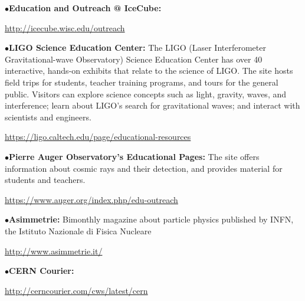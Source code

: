 \smallskip


\smallskip

\item{$\bullet$}{\bf Education and Outreach @ IceCube:}
    \item{}\qquad\url{http://icecube.wisc.edu/outreach}


\smallskip

\item{$\bullet$}{\bf LIGO Science Education Center:}
The LIGO (Laser Interferometer 
Gravitational-wave Observatory) Science Education Center has over 
40 interactive, hands-on exhibits that relate to the science of LIGO. The 
site hosts field trips for students, teacher training programs, and tours 
for the general public. Visitors can explore science concepts such as 
light, gravity, waves, and interference; learn about LIGO's search for 
gravitational waves; and interact with scientists and engineers.
     \item{}\qquad\url{https://ligo.caltech.edu/page/educational-resources}


\smallskip

\item{$\bullet$}{\bf Pierre Auger Observatory's Educational Pages:}
The site offers information about cosmic rays and their detection, and provides material for students and teachers.
     \item{}\qquad\url{https://www.auger.org/index.php/edu-outreach}

\medskip
\medskip



\medskip


\item{$\bullet$}{\bf Asimmetrie:}
Bimonthly magazine about particle physics published by INFN, the Istituto Nazionale di Fisica Nucleare
	\item{}\qquad\url{http://www.asimmetrie.it/}
\medskip

\item{$\bullet$}{\bf CERN Courier:}
	\item{}\qquad\url{http://cerncourier.com/cws/latest/cern}
\medskip

